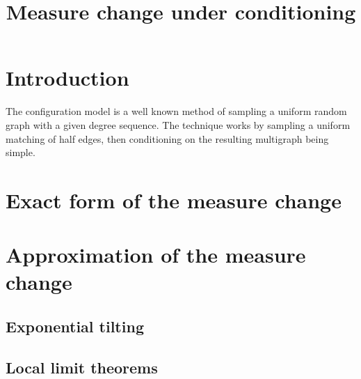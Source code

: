 \documentclass{article}
\title{Measure change under conditioning}
\author{}
\date{}
\begin{document}
\maketitle

\section{Introduction}

The configuration model is a well known method of sampling a uniform random graph with a given degree sequence. The technique works by sampling a uniform matching of half edges, then conditioning on the resulting multigraph being simple.

\section{Exact form of the measure change}

\section{Approximation of the measure change}

\subsection{Exponential tilting}

\subsection{Local limit theorems}
\end{document}
